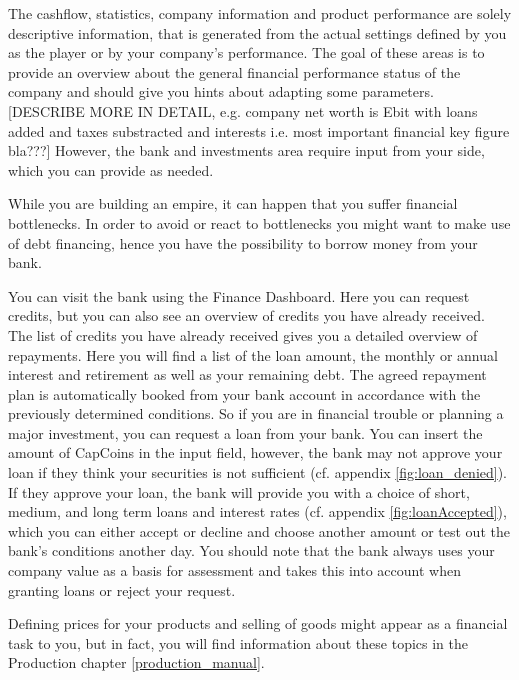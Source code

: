  The cashflow, statistics, company information and product performance are solely descriptive information, that is generated from the actual settings defined by you as the player or by your company’s performance. The goal of these areas is to provide an overview about the general financial performance status of the company and should give you hints about adapting some parameters. 
 [DESCRIBE MORE IN DETAIL, e.g. company net worth is Ebit with loans added and taxes substracted and interests i.e. most important financial key figure bla???] However, the bank and investments area require input from your side, which you can provide as needed. 

While you are building an empire, it can happen that you suffer financial bottlenecks. In order to avoid or react to bottlenecks you might want to make use of debt financing, hence you have the possibility to borrow money from your bank. 

You can visit the bank using the Finance Dashboard. Here you can request credits, but you can also see an overview of credits you have already received.
The list of credits you have already received gives you a detailed overview of repayments. Here you will find a list of the loan amount, the monthly or annual interest and retirement as well as your remaining debt. The agreed repayment plan is automatically booked from your bank account in accordance with the previously determined conditions.
So if you are in financial trouble or planning a major investment, you can request a loan from your bank. You can insert the amount of CapCoins in the input field, however, the bank may not approve your loan if they think your securities is not sufficient (cf. appendix \ref{fig:loan_denied}). If they approve your loan, the bank will provide you with a choice of short, medium, and long term loans and interest rates (cf. appendix  \ref{fig:loanAccepted}), which you can either accept or decline and choose another amount or test out the bank's conditions another day. You should note that the bank always uses your company value as a basis for assessment and takes this into account when granting loans or reject your request. 

Defining prices for your products and selling of goods might appear as a financial task to you, but in fact, you will find information about these topics in the Production chapter \ref{production_manual}.